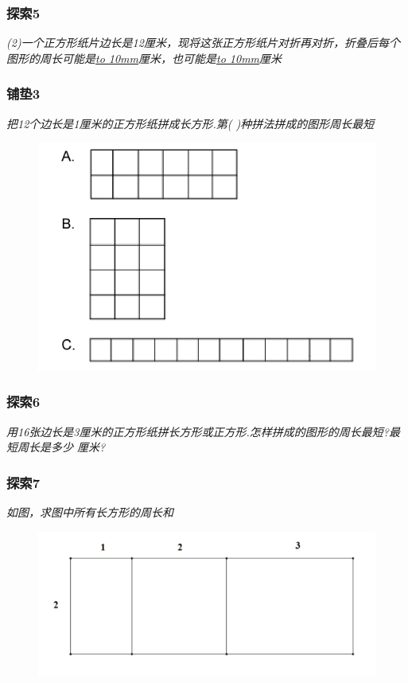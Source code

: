 \begin{frame}
    \frametitle{探索5}
    \textit{(2)一个正方形纸片边长是12厘米，现将这张正方形纸片对折再对折，折叠后每个图形的周长可能是\underline{\hbox to 10mm{}}厘米，也可能是\underline{\hbox to 10mm{}}厘米}
\end{frame}

\begin{frame}
    \frametitle{铺垫3}
    \textit{把12个边长是1厘米的正方形纸拼成长方形.第( )种拼法拼成的图形周长最短}
    \begin{figure}[H] 
        \centering
        \includegraphics[width=1\textwidth]{./pics/Chapter_1/pudian3.png}
    \end{figure}
\end{frame}

\begin{frame}
    \frametitle{探索6}
    \textit{用16张边长是3厘米的正方形纸拼长方形或正方形.怎样拼成的图形的周长最短?最短周长是多少
    厘米?}
\end{frame}

\begin{frame}
    \frametitle{探索7}
    \textit{如图，求图中所有长方形的周长和}
    \begin{figure}[H] 
        \centering
        \includegraphics[width=1\textwidth]{./pics/Chapter_1/tansuo7.png}
    \end{figure}
\end{frame}

